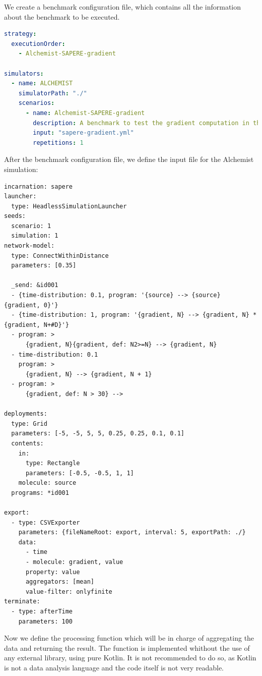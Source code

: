 \documentclass[12pt,a4paper,openright,twoside]{book}
\begin{document}
We create a benchmark configuration file, which contains all the information about the benchmark to be executed.

\begin{lstlisting}[language=yaml, caption={Case of study: benchmark configuration file}]
strategy:
  executionOrder:
    - Alchemist-SAPERE-gradient

simulators:
  - name: ALCHEMIST
    simulatorPath: "./"
    scenarios:
      - name: Alchemist-SAPERE-gradient
        description: A benchmark to test the gradient computation in the Sapere incarnation
        input: "sapere-gradient.yml"
        repetitions: 1
\end{lstlisting}

After the benchmark configuration file, we define the input file for the Alchemist simulation:

\begin{lstlisting}[caption={Case of study: Alchemist input file}]
incarnation: sapere
launcher:
  type: HeadlessSimulationLauncher
seeds:
  scenario: 1
  simulation: 1
network-model:
  type: ConnectWithinDistance
  parameters: [0.35]

  _send: &id001
  - {time-distribution: 0.1, program: '{source} --> {source} {gradient, 0}'}
  - {time-distribution: 1, program: '{gradient, N} --> {gradient, N} *{gradient, N+#D}'}
  - program: >
      {gradient, N}{gradient, def: N2>=N} --> {gradient, N}
  - time-distribution: 0.1
    program: >
      {gradient, N} --> {gradient, N + 1}
  - program: >
      {gradient, def: N > 30} -->

deployments:
  type: Grid
  parameters: [-5, -5, 5, 5, 0.25, 0.25, 0.1, 0.1]
  contents:
    in:
      type: Rectangle
      parameters: [-0.5, -0.5, 1, 1]
    molecule: source
  programs: *id001
  
export:
  - type: CSVExporter
    parameters: {fileNameRoot: export, interval: 5, exportPath: ./}
    data: 
      - time
      - molecule: gradient, value
      property: value
      aggregators: [mean]
      value-filter: onlyfinite
terminate:
  - type: afterTime
    parameters: 100
\end{lstlisting}

Now we define the processing function which will be in charge of aggregating the data and returning the result.
The function is implemented whithout the use of any external library, using pure Kotlin.
It is not recommended to do so, as Kotlin is not a data analysis language and the code itself is not very readable.
\end{document}
